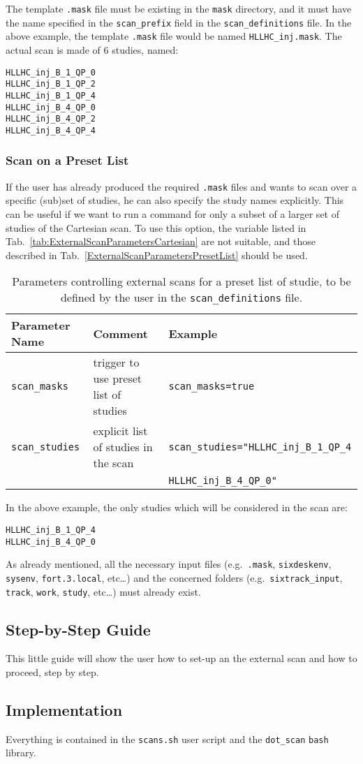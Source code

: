 The template \texttt{.mask} file must be existing in the \texttt{mask}
directory, and it must have the name specified in the \texttt{scan\_prefix}
field in the \texttt{scan\_definitions} file. In the above example,
the template \texttt{.mask} file would be named \texttt{HLLHC\_inj.mask}.
The actual scan is made of 6 studies, named:
\begin{verbatim}
HLLHC_inj_B_1_QP_0
HLLHC_inj_B_1_QP_2
HLLHC_inj_B_1_QP_4
HLLHC_inj_B_4_QP_0
HLLHC_inj_B_4_QP_2
HLLHC_inj_B_4_QP_4
\end{verbatim}

\subsubsection{Scan on a Preset List}
If the user has already produced the required \texttt{.mask} files
and wants to scan over a specific (sub)set of studies, he can also
specify the study names explicitly. This can be useful if we want
to run a command for only a subset of a larger set of studies of the
Cartesian scan. To use this option, the variable listed in
Tab.~\ref{tab:ExternalScanParametersCartesian} are not suitable, and
those described in Tab.~\ref{ExternalScanParametersPresetList} should be used.
\begin{table}[h]
\begin{center}
  \caption{Parameters controlling external scans for a preset list
    of studie, to be defined by the user in the \texttt{scan\_definitions}
    file.}
    \label{tab:ExternalScanParametersPresetList}
    \begin{tabular}{|l|l|l|}
    \hline
    \rowcolor{blue!30}
    \textbf{Parameter Name} & \textbf{Comment} & \textbf{Example} \\
    \hline
    \texttt{scan\_masks} & trigger to use preset list of studies &
       \texttt{scan\_masks=true} \\
    \texttt{scan\_studies} & explicit list of studies in the scan &
    \texttt{scan\_studies="HLLHC\_inj\_B\_1\_QP\_4  } \\
     & & \texttt{HLLHC\_inj\_B\_4\_QP\_0"} \\
    \hline
    \end{tabular}
\end{center}
\end{table}
In the above example, the only studies which will be considered in the
scan are:
\begin{verbatim}
HLLHC_inj_B_1_QP_4
HLLHC_inj_B_4_QP_0
\end{verbatim}
As already mentioned, all the necessary input files (e.g.~\texttt{.mask},
\texttt{sixdeskenv}, \texttt{sysenv}, \texttt{fort.3.local}, etc\ldots)
and the concerned folders (e.g.~\texttt{sixtrack\_input}, \texttt{track},
\texttt{work}, \texttt{study}, etc\ldots) must already exist.

\subsection{Step-by-Step Guide}
This little guide will show the user how to set-up an the external
scan and how to proceed, step by step.

\subsection{Implementation}
Everything is contained in the \texttt{scans.sh} user script
and the \texttt{dot\_scan} \texttt{bash} library.
